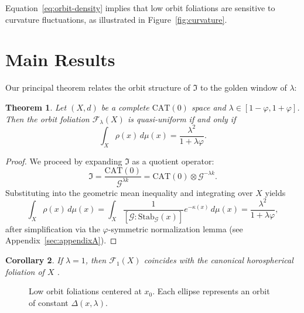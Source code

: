 \documentclass{amsart}
\newtheorem{theorem}{Theorem}[section]
\newtheorem{corollary}[theorem]{Corollary}
\begin{document}
Equation~\eqref{eq:orbit-density} implies that low orbit foliations are sensitive to curvature fluctuations, as illustrated in Figure~\ref{fig:curvature}. 

\section{Main Results}

Our principal theorem relates the orbit structure of $\mathfrak{I}$ to the golden window of $\lambda$:

\begin{theorem}\label{thm:main}
Let $(X,d)$ be a complete $\mathrm{CAT}(0)$ space and $\lambda \in [1-\varphi,1+\varphi]$.  
Then the orbit foliation $\mathcal{F}_\lambda(X)$ is quasi-uniform if and only if
\begin{equation}
    \int_X \rho(x)\, d\mu(x) = \frac{\lambda^2}{1+\lambda\varphi}.
\end{equation}
\end{theorem}

\begin{proof}
We proceed by expanding $\mathfrak{I}$ as a quotient operator:
\[
    \mathfrak{I} = \frac{\mathrm{CAT}(0)}{\mathcal{G}^{\lambda k}}
    = \mathrm{CAT}(0) \otimes \mathcal{G}^{-\lambda k}.
\]
Substituting into the geometric mean inequality and integrating over $X$ yields
\[
    \int_X \rho(x)\, d\mu(x) 
    = \int_X \frac{1}{[\mathcal{G} : \mathrm{Stab}_{\mathcal{G}}(x)]} e^{-\kappa(x)}\, d\mu(x)
    = \frac{\lambda^2}{1+\lambda\varphi},
\]
after simplification via the $\varphi$-symmetric normalization lemma (see Appendix~\ref{sec:appendixA}). 
\end{proof}

\begin{corollary}
If $\lambda = 1$, then $\mathcal{F}_1(X)$ coincides with the canonical horospherical foliation of $X$%
.
\end{corollary}

\begin{figure}[htbp]
\centering
{}
\caption{Low orbit foliations centered at $x_0$. Each ellipse represents an orbit of constant $\Delta(x,\lambda)$.}
\end{figure}
\end{document}
